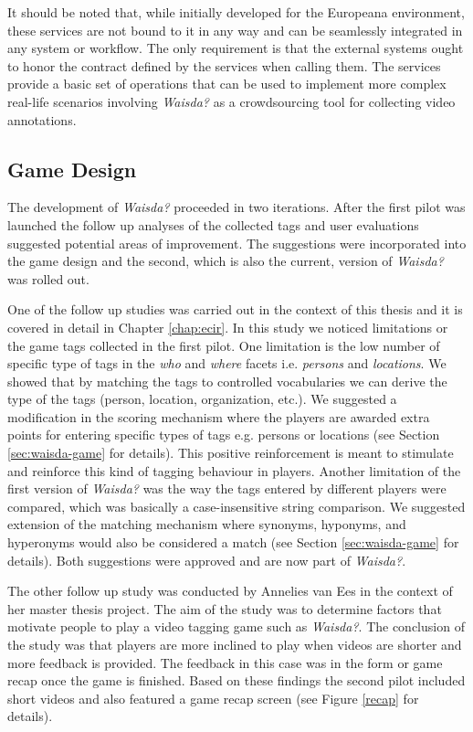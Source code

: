 It should be noted that, while initially developed for the Europeana environment, these services are not bound to it in any way and can be seamlessly integrated in any system or workflow. The only requirement is that the external systems ought to honor the contract defined by the services when calling them. The services provide a basic set of operations that can be used to implement more complex real-life scenarios involving \textit{Waisda?} as a crowdsourcing tool for collecting video annotations.
\subsection{Game Design}\label{chap:waisda:game-design}
The development of \textit{Waisda?} proceeded in two iterations. After the first pilot was launched the follow up analyses of the collected tags \cite{Annelies,ecir} and user evaluations suggested potential areas of improvement. The suggestions were incorporated into the game design and the second, which is also the current, version of \textit{Waisda?} was rolled out.

One of the follow up studies \cite{ecir} was carried out in the context of this thesis and it is covered in detail in Chapter \ref{chap:ecir}. In this study we noticed limitations or the game tags collected in the first pilot. One limitation is the low number of specific type of tags in the \textit{who} and \textit{where} facets i.e. \textit{persons} and \textit{locations}. We showed that by matching the tags to controlled vocabularies we can derive the type of the tags (person, location, organization, etc.). We suggested a modification in the scoring mechanism where the players are awarded extra points for entering specific types of tags e.g. persons or locations (see Section \ref{sec:waisda-game} for details). This positive reinforcement is meant to stimulate and reinforce this kind of tagging behaviour in players. Another limitation of the first version of \textit{Waisda?} was the way the tags entered by different players were compared, which was basically a case-insensitive string comparison. We suggested extension of the matching mechanism where synonyms, hyponyms, and hyperonyms would also be considered a match (see Section \ref{sec:waisda-game} for details). Both suggestions were approved and are now part of \textit{Waisda?}.

The other follow up study \cite{Annelies} was conducted by Annelies van Ees in the context of her master thesis project. The aim of the study was to determine factors that motivate people to play a video tagging game such as \textit{Waisda?}. The conclusion of the study was that players are more inclined to play when videos are shorter and more feedback is provided. The feedback in this case was in the form or game recap once the game is finished. Based on these findings the second pilot included short videos
and also featured a game recap screen (see Figure \ref{recap} for details).

